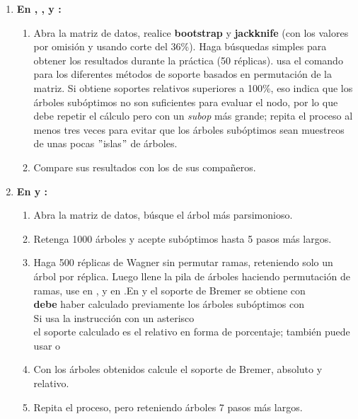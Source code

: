 \begin{enumerate}
\item \textbf{En , ,  y :}
	\begin{enumerate}
		\item  Abra la matriz de datos, realice \textbf{bootstrap} y \textbf{jackknife} (con los valores por omisi\'on y usando corte del 36\%). Haga b\'usquedas simples para obtener los resultados durante la pr\'actica (50 r\'eplicas). 
		 usa el comando  para los diferentes m\'etodos de soporte basados en permutaci\'on de la matriz. Si obtiene soportes relativos superiores a 100\%, eso indica que los \'arboles sub\'optimos no son suficientes para evaluar el nodo, por lo que debe repetir el c\'alculo pero con un \emph{subop} m\'as grande; repita el proceso al menos tres veces para evitar que los \'arboles sub\'optimos sean muestreos de unas pocas $"$islas$"$ de \'arboles.
		\item Compare sus resultados con los de sus compa\~neros. 
	\end{enumerate}

\item \textbf{En  y :}
	\begin{enumerate}
		\item Abra la matriz de datos, b\'usque el \'arbol m\'as parsimonioso.\\
		\item Retenga 1000 \'arboles y acepte sub\'optimos hasta  5 pasos m\'as largos. 
		\item Haga 500 r\'eplicas de Wagner sin permutar ramas, reteniendo solo un \'arbol por r\'eplica. Luego llene la pila de \'arboles haciendo permutaci\'on de ramas, use  en , y en  .En  y  el soporte de Bremer se obtiene con \\
		\textbf{debe} haber calculado previamente los \'arboles  sub\'optimos con \\
		Si usa la instrucci\'on con un asterisco \\
		el soporte calculado es el relativo en forma de porcentaje; tambi\'en puede usar \cmd{bsupport [;} o \cmd{bsupport ];}
		\item Con los \'arboles obtenidos calcule el soporte de Bremer, absoluto y relativo.\\
		\item Repita el proceso, pero reteniendo \'arboles 7 pasos m\'as largos.\\
	\end{enumerate}


\end{enumerate}
